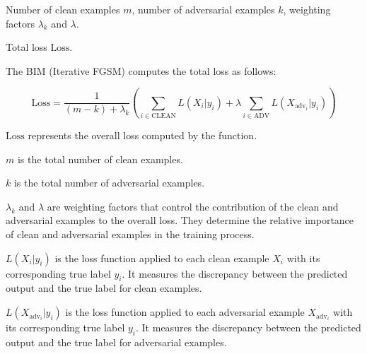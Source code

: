 Number of clean examples $m$, number of adversarial examples $k$, weighting factors $\lambda_k$ and $\lambda$.

Total loss $\text{Loss}$.

The BIM (Iterative FGSM) computes the total loss as follows:

\[
\text{Loss} = \frac{1}{{(m - k)} + \lambda_k } \left( \sum_{i \in \text{CLEAN}} L(X_i | y_i) + \lambda \sum_{i \in \text{ADV}} L(X_{\text{adv}_i} | y_i) \right)
\]

$\text{Loss}$ represents the overall loss computed by the function.

$m$ is the total number of clean examples.

$k$ is the total number of adversarial examples.

$\lambda_k$ and $\lambda$ are weighting factors that control the contribution of the clean and adversarial examples to the overall loss. They determine the relative importance of clean and adversarial examples in the training process.

$L(X_i | y_i)$ is the loss function applied to each clean example $X_i$ with its corresponding true label $y_i$. It measures the discrepancy between the predicted output and the true label for clean examples.

$L(X_{\text{adv}_i} | y_i)$ is the loss function applied to each adversarial example $X_{\text{adv}_i}$ with its corresponding true label $y_i$. It measures the discrepancy between the predicted output and the true label for adversarial examples.
